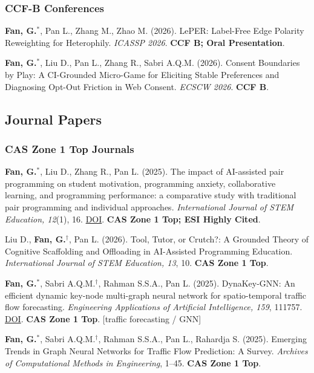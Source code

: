 \documentclass[a4paper,10pt]{article}
\newcommand{\papertag}[1]{\textcolor{cvgray}{\footnotesize\textsf{[#1]}}}
\newcommand{\pubitem}[1]{\item #1}
\begin{document}
\subsubsection*{CCF-B Conferences}
\begin{enumerate}[label=\textbf{[C\arabic*]},resume]
  \pubitem{\textbf{Fan, G.}$^{*}$, Pan L., Zhang M., Zhao M. (2026). LePER: Label-Free Edge Polarity Reweighting for Heterophily. \textit{ICASSP 2026}. \textbf{CCF B; Oral Presentation}.}

  \pubitem{\textbf{Fan, G.}$^{*}$, Liu D., Pan L., Zhang R., Sabri A.Q.M. (2026). Consent Boundaries by Play: A CI-Grounded Micro-Game for Eliciting Stable Preferences and Diagnosing Opt-Out Friction in Web Consent. \textit{ECSCW 2026}. \textbf{CCF B}.}
\end{enumerate}

\subsection*{Journal Papers}
\subsubsection*{CAS Zone 1 Top Journals}
\begin{enumerate}[label=\textbf{[J\arabic*]}]
  \pubitem{\textbf{Fan, G.}$^{*}$, Liu D., Zhang R., Pan L. (2025). The impact of AI-assisted pair programming on student motivation, programming anxiety, collaborative learning, and programming performance: a comparative study with traditional pair programming and individual approaches. \textit{International Journal of STEM Education, 12}(1), 16. \href{https://doi.org/10.1186/s40594-025-00537-3}{DOI}. \textbf{CAS Zone 1 Top; ESI Highly Cited}.}

  \pubitem{Liu D., \textbf{Fan, G.}$^{\dagger}$, Pan L. (2026). Tool, Tutor, or Crutch?: A Grounded Theory of Cognitive Scaffolding and Offloading in AI-Assisted Programming Education. \textit{International Journal of STEM Education, 13}, 10. \textbf{CAS Zone 1 Top}.}

  \pubitem{\textbf{Fan, G.}$^{*}$, Sabri A.Q.M.$^{\dagger}$, Rahman S.S.A., Pan L. (2025). DynaKey-GNN: An efficient dynamic key-node multi-graph neural network for spatio-temporal traffic flow forecasting. \textit{Engineering Applications of Artificial Intelligence, 159}, 111757. \href{https://doi.org/10.1016/j.engappai.2025.111757}{DOI}. \textbf{CAS Zone 1 Top}. \papertag{traffic forecasting / GNN}}

  \pubitem{\textbf{Fan, G.}$^{*}$, Sabri A.Q.M.$^{\dagger}$, Rahman S.S.A., Pan L., Rahardja S. (2025). Emerging Trends in Graph Neural Networks for Traffic Flow Prediction: A Survey. \textit{Archives of Computational Methods in Engineering}, 1--45. \textbf{CAS Zone 1 Top}.}
\end{enumerate}
\end{document}
